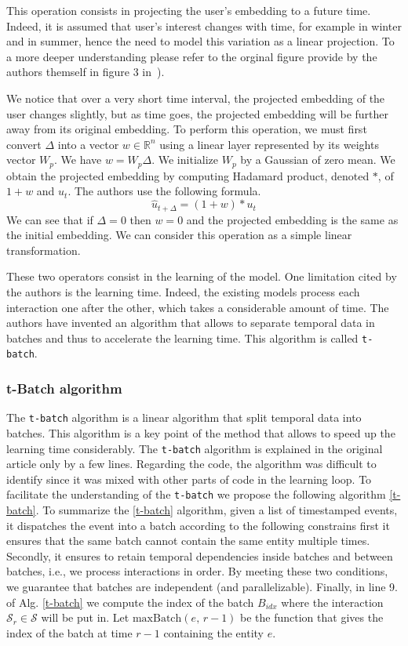 This operation consists in projecting the user's embedding to a future time. Indeed, it is assumed that user's interest changes with time, for example in winter and in summer, hence the need to model this variation as a linear projection. To a more deeper understanding please refer to the orginal figure provide by the authors themself in figure 3 in~\cite{kumar2019predicting}).

We notice that over a very short time interval, the projected embedding of the user changes slightly, but as time goes, the projected embedding will be further away from its original embedding. To perform this operation, we must first convert $\Delta$ into a vector $w \in \mathbb{R}^n$ using a linear layer represented by its weights vector $W_p$. We have $w = W_p \Delta$. We initialize $W_p$ by a Gaussian of zero mean. We obtain the projected embedding by computing Hadamard product, denoted $*$, of $1+w$ and $u_t$. The authors use the following formula.
$$
\widehat u_{t+\Delta} = (1+w) * u_t
$$
We can see that if $\Delta = 0$ then $w=0$ and the projected embedding is the same as the initial embedding. We can consider this operation as a simple linear transformation.

These two operators consist in the learning of the model. One limitation cited by the authors is the learning time. Indeed, the existing models process each interaction one after the other, which takes a considerable amount of time. The authors have invented an algorithm that allows to separate temporal data in batches and thus to accelerate the learning time. This algorithm is called \texttt{t-batch}.

\subsubsection{t-Batch algorithm}

The \texttt{t-batch} algorithm is a linear algorithm that split temporal data into batches. This algorithm is a key point of the method that allows to speed up the learning time considerably. The \texttt{t-batch} algorithm is explained in the original article only by a few lines. Regarding the code, the algorithm was difficult to identify since it was mixed with other parts of code in the learning loop. To facilitate the understanding of the \texttt{t-batch} we propose the following algorithm \ref{t-batch}. To summarize the \ref{t-batch} algorithm, given a list of timestamped events, it dispatches the event into a batch according to the following constrains first it ensures that the same batch cannot contain the same entity multiple times. Secondly, it ensures to retain temporal dependencies inside batches and between batches, i.e., we process interactions in order. By meeting these two conditions, we guarantee that batches are independent (and parallelizable). Finally, in line 9. of Alg. \ref{t-batch} we compute the index of the batch $B_{idx}$ where the interaction $\mathcal{S}_r \in \mathcal{S}$ will be put in. Let $\text{maxBatch}(e, \,r-1)$ be the function that gives the index of the batch at time $r-1$ containing the entity $e$. 

